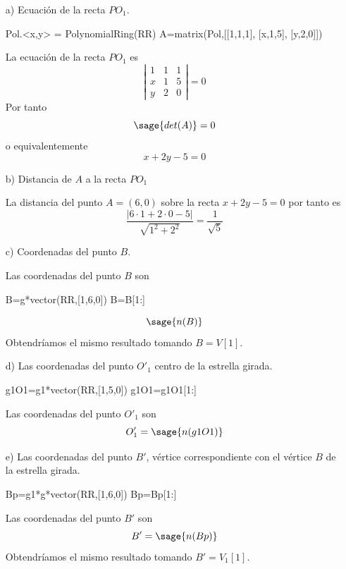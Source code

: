 \documentclass{amsart}
\begin{document}
\begin{enumerate} 
\item[a)] Ecuación de la recta $PO_1$.

\begin{sageblock}
Pol.<x,y> = PolynomialRing(RR)
A=matrix(Pol,[[1,1,1],
            [x,1,5],
            [y,2,0]])
\end{sageblock}

La ecuación de la recta $PO_1$ es
\[ \left| \begin{array}{rrr}
1 & 1 & 1  \\            
x & 1 & 5  \\          
y & 2 & 0            
\end{array} \right| = 0\] Por tanto \[ \sage{det(A)} = 0 \] o equivalentemente \[ x + 2y - 5 = 0 \]

\item[b)] Distancia de $A$ a la recta $PO_1$


La distancia del punto $A = (6,0)$ sobre la recta $x+2y-5=0$ por tanto es \[ \frac{\vert 6\cdot 1+2\cdot 0-5\vert}{\sqrt{1^2+2^2}} = \frac{1}{\sqrt{5}} \]


\item[c)] Coordenadas del punto $B$.

Las coordenadas del punto $B$ son
\begin{sageblock}
B=g*vector(RR,[1,6,0])
B=B[1:]
\end{sageblock}
\[ \sage{n(B)} \] Obtendríamos el mismo resultado tomando $B=V[1]$.

\item[d)] Las coordenadas del punto $O'_1$ centro de la estrella girada.
 
\begin{sageblock}
g1O1=g1*vector(RR,[1,5,0])
g1O1=g1O1[1:]
\end{sageblock}
Las coordenadas del punto $O'_1$ son
\[ O'_1 = \sage{n(g1O1)} \]

\item[e)] Las coordenadas del punto $B'$, vértice correspondiente con el vértice $B$ de la estrella girada.

\begin{sageblock}
Bp=g1*g*vector(RR,[1,6,0])
Bp=Bp[1:]
\end{sageblock}

Las coordenadas del punto $B'$ son
\[ B' = \sage{n(Bp)} \] Obtendríamos el mismo resultado tomando $B'=V_1[1]$.

\end{enumerate}
\end{document}
